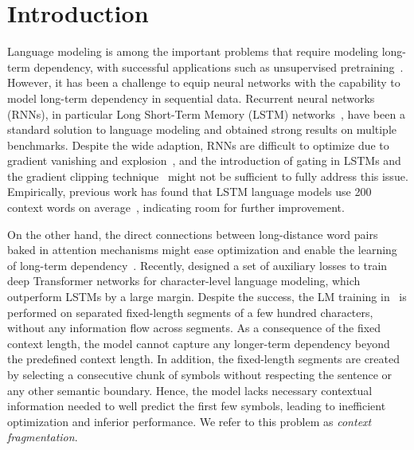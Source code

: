 \section{Introduction}
\label{sec:intro}

Language modeling is among the important problems that require modeling long-term dependency, with successful applications such as unsupervised pretraining~\citep{dai2015semi,peters2018deep,radford2018improving,devlin2018bert}.
However, it has been a challenge to equip neural networks with the capability to model long-term dependency in sequential data.
Recurrent neural networks (RNNs), in particular Long Short-Term Memory (LSTM) networks~\citep{hochreiter1997long}, have been a standard solution to language modeling and obtained strong results on multiple benchmarks.
Despite the wide adaption, RNNs are difficult to optimize due to gradient vanishing and explosion~\citep{hochreiter2001gradient}, and the introduction of gating in LSTMs and the gradient clipping technique~\citep{graves2013generating} might not be sufficient to fully address this issue.
Empirically, previous work has found that LSTM language models use 200 context words on average~\citep{khandelwal2018sharp}, indicating room for further improvement.

On the other hand, the direct connections between long-distance word pairs baked in attention mechanisms might ease optimization and enable the learning of long-term dependency~\citep{bahdanau2014neural,vaswani2017attention}.
Recently, \citet{al2018character} designed a set of auxiliary losses to train deep Transformer networks for character-level language modeling, which outperform LSTMs by a large margin.
Despite the success, the LM training in~\citet{al2018character} is performed on separated fixed-length segments of a few hundred characters, without any information flow across segments.
As a consequence of the fixed context length, the model cannot capture any longer-term dependency beyond the predefined context length.
In addition, the fixed-length segments are created by selecting a consecutive chunk of symbols without respecting the sentence or any other semantic boundary.
Hence, the model lacks necessary contextual information needed to well predict the first few symbols, leading to inefficient optimization and inferior performance.
We refer to this problem as \textit{context fragmentation}.


